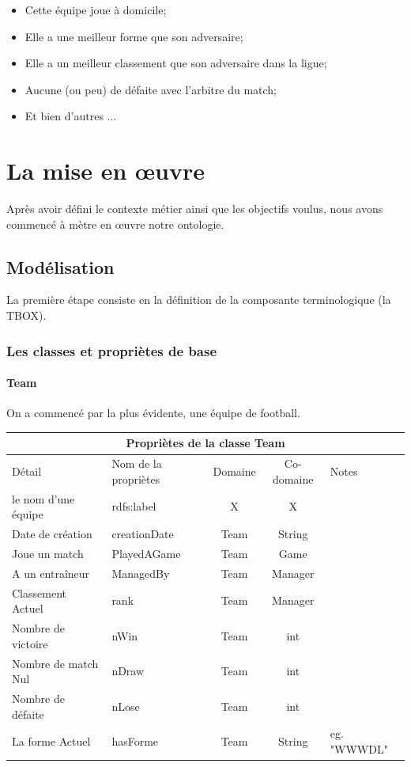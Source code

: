 \documentclass[oneside,13pt,a4paper]{article}
\begin{document}
\begin{itemize}
  \item Cette équipe joue à domicile;
  \item Elle a une meilleur forme que son adversaire;
  \item Elle a un meilleur classement que son adversaire dans la ligue;
  \item Aucune (ou peu) de défaite avec l'arbitre du match;
  \item Et bien d'autres ...
\end{itemize}

\section{La mise en œuvre}

Après avoir défini le contexte métier ainsi que les objectifs voulus, nous avons commencé à mètre en œuvre notre ontologie.

\subsection{Modélisation}

La première étape consiste en la définition de la composante terminologique (la TBOX).

\subsubsection{Les classes et propriètes de base}

\paragraph{Team}

On a commencé par la plus évidente, une équipe de football.

\begin{tabular}{| l | l | c | c | p{3cm} |}
  \hline
  \multicolumn{5}{|c|}{Propriètes de la classe \textbf{Team}} \\ \hline
  Détail & Nom de la propriètes & Domaine & Co-domaine & Notes \\ \hline
  le nom d'une équipe & rdfs:label  & X & X &  \\ \hline
  Date de création & creationDate & Team & String &  \\ \hline
  Joue un match & PlayedAGame & Team & Game &  \\ \hline
  A un entraîneur & ManagedBy & Team  & Manager &  \\ \hline
  Classement Actuel & rank  & Team & Manager &  \\ \hline
  Nombre de victoire & nWin & Team & int &  \\ \hline
  Nombre de match Nul & nDraw & Team & int &  \\ \hline
  Nombre de défaite & nLose & Team & int &  \\ \hline
  La forme Actuel & hasForme & Team & String & eg. "WWWDL" \\ 
  \hline
\end{tabular}
\end{document}

